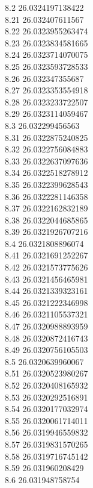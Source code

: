 {8.2	26.0324197138422\\
8.21	26.032407611567\\
8.22	26.0323955263474\\
8.23	26.0323834581665\\
8.24	26.0323714070075\\
8.25	26.0323593728533\\
8.26	26.032347355687\\
8.27	26.0323353554918\\
8.28	26.0323233722507\\
8.29	26.0323114059467\\
8.3	26.032299456563\\
8.31	26.0322875240825\\
8.32	26.0322756084883\\
8.33	26.0322637097636\\
8.34	26.0322518278912\\
8.35	26.0322399628543\\
8.36	26.0322281146358\\
8.37	26.0322162832189\\
8.38	26.0322044685865\\
8.39	26.0321926707216\\
8.4	26.0321808896074\\
8.41	26.0321691252267\\
8.42	26.0321573775626\\
8.43	26.0321456465981\\
8.44	26.0321339323161\\
8.45	26.0321222346998\\
8.46	26.0321105537321\\
8.47	26.0320988893959\\
8.48	26.0320872416743\\
8.49	26.0320756105503\\
8.5	26.0320639960067\\
8.51	26.0320523980267\\
8.52	26.0320408165932\\
8.53	26.0320292516891\\
8.54	26.0320177032974\\
8.55	26.0320061714011\\
8.56	26.0319946559832\\
8.57	26.0319831570265\\
8.58	26.0319716745142\\
8.59	26.031960208429\\
8.6	26.031948758754\\
}
